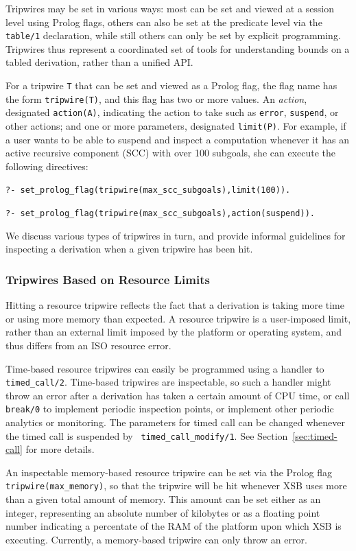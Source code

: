 Tripwires may be set in various ways: most can be set and viewed at a
session level using Prolog flags, others can also be set at the
predicate level via the {\tt table/1} declaration, while still others
can only be set by explicit programming.  Tripwires thus represent a
coordinated set of tools for understanding bounds on a tabled
derivation, rather than a unified API.

For a tripwire {\tt T} that can be set and viewed as a Prolog flag,
the flag name has the form {\tt tripwire(T)}, and this flag has two or
more values.  An {\em action}, designated {\tt action(A)}, indicating
the action to take such as {\tt error}, {\tt suspend}, or other
actions; and one or more parameters, designated {\tt limit(P)}.
For example, if a user wants to be able to suspend and inspect a
computation whenever it has an active recursive component (SCC) with
over 100 subgoals, she can execute the following directives:

{\tt ?- set\_prolog\_flag(tripwire(max\_scc\_subgoals),limit(100)).}

{\tt ?- set\_prolog\_flag(tripwire(max\_scc\_subgoals),action(suspend)).}

We discuss various types of tripwires in turn, and provide informal
guidelines for inspecting a derivation when a given tripwire has been
hit.

\subsubsection{Tripwires Based on Resource Limits}
%
Hitting a resource tripwire reflects the fact that a derivation is
taking more time or using more memory than expected.  A resource
tripwire is a user-imposed limit, rather than an external limit
imposed by the platform or operating system, and thus differs from an
ISO resource error.

%
Time-based resource tripwires can easily
be programmed using a handler to {\tt timed\_call/2}.  Time-based
tripwires are inspectable, so such a handler might throw an error
after a derivation has taken a certain amount of CPU time, or call
{\tt break/0} to implement periodic inspection points, or implement
other periodic analytics or monitoring.  The parameters for timed call
can be changed whenever the timed call is suspended by {\tt
  timed\_call\_modify/1}.  See Section~\ref{sec:timed-call} for more
details.

 An inspectable memory-based resource
tripwire can be set via the Prolog flag {\tt tripwire(max\_memory)},
so that the tripwire will be hit whenever XSB uses more than a given
total amount of memory.  This amount can be set either as an integer,
representing an absolute number of kilobytes or as a floating point
number indicating a percentate of the RAM of the platform upon which
XSB is executing.  Currently, a memory-based tripwire can only throw
an error.

